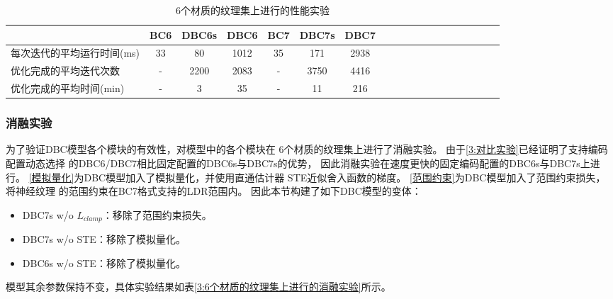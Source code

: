 \begin{table*}[htbp]
    \centering
    \caption{6个材质的纹理集上进行的性能实验}
    \label{3:6个材质的纹理集上进行的性能实验}        
    \begin{tabular}{lcccccccccccccccccc}
        \toprule
                                    & BC6 & DBC6s & DBC6 & BC7  & DBC7s & DBC7 \\
        \midrule
        每次迭代的平均运行时间(ms)  & 33  &  80    & 1012 & 35   & 171   &  2938 \\
        优化完成的平均迭代次数      & -   &  2200  & 2083 & -   & 3750   &  4416 \\
        优化完成的平均时间(min)     & -   &  3     & 35   & -   & 11      &  216\\
        \bottomrule
\end{tabular} %
\end{table*}

\subsubsection{消融实验}

为了验证DBC模型各个模块的有效性，对模型中的各个模块在
6个材质的纹理集上进行了消融实验。
由于\ref{3:对比实验}已经证明了支持编码配置动态选择
的DBC6/DBC7相比固定配置的DBC6s与DBC7s的优势，
因此消融实验在速度更快的固定编码配置的DBC6s与DBC7s上进行。
\ref{模拟量化}为DBC模型加入了模拟量化，并使用直通估计器
STE\cite{bengio2013estimating}近似舍入函数的梯度。
\ref{范围约束}为DBC模型加入了范围约束损失，将神经纹理
的范围约束在BC7格式支持的LDR范围内。
因此本节构建了如下DBC模型的变体：
\begin{itemize}
    \item DBC7s w/o $L_{clamp}$：移除了范围约束损失。
    \item DBC7s w/o STE：移除了模拟量化。
    \item DBC6s w/o STE：移除了模拟量化。
\end{itemize}
模型其余参数保持不变，具体实验结果如表\ref{3:6个材质的纹理集上进行的消融实验}所示。

